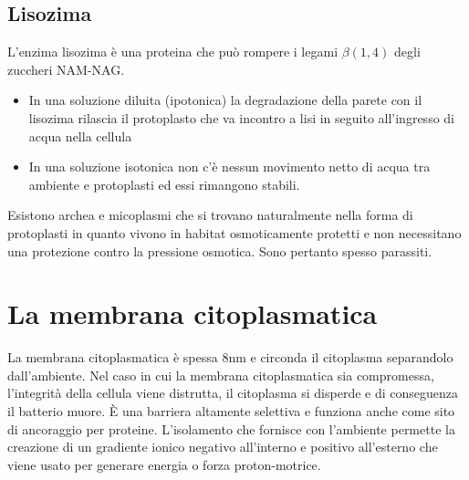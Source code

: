 \subsection{Lisozima}
L’enzima lisozima è una proteina che può rompere i legami $\beta(1, 4)$ degli zuccheri NAM-NAG.
\begin{itemize}
\item In una soluzione diluita (ipotonica) la degradazione della parete con il lisozima rilascia il protoplasto che va incontro a lisi in seguito 
all’ingresso di acqua nella cellula
\item In una soluzione isotonica non c’è nessun movimento netto di acqua tra ambiente e protoplasti ed essi rimangono stabili.
\end{itemize}
Esistono archea e micoplasmi che si trovano naturalmente nella forma di protoplasti in quanto vivono in habitat osmoticamente protetti e non necessitano una protezione contro la 
pressione osmotica. Sono pertanto spesso parassiti. 
\section{La membrana citoplasmatica}
La membrana citoplasmatica \`e spessa $8\si{\nano\metre}$ e circonda il citoplasma separandolo dall’ambiente. Nel caso in cui la membrana citoplasmatica sia compromessa, l’integrità 
della cellula viene distrutta, il citoplasma si disperde e di conseguenza il batterio muore. \`E una barriera altamente selettiva e funziona anche come sito di ancoraggio per proteine.
L'isolamento che fornisce con l'ambiente permette la creazione di un gradiente ionico negativo all'interno e positivo all'esterno che viene usato per generare energia o forza
proton-motrice. 
